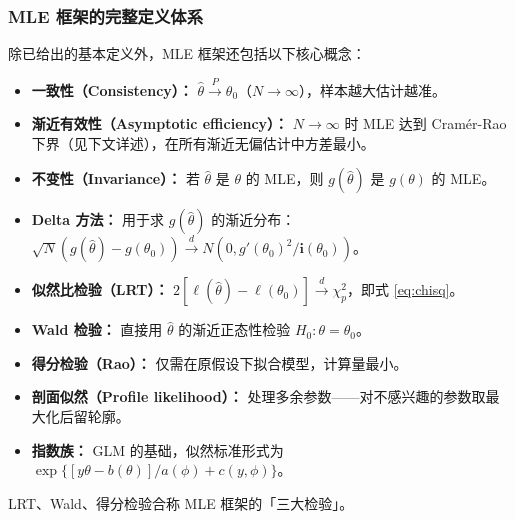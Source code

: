 \subsubsection{MLE 框架的完整定义体系}

除已给出的基本定义外，MLE 框架还包括以下核心概念：

\begin{itemize}
    \item \textbf{一致性（Consistency）：} $\hat{\theta} \xrightarrow{P} \theta_0$（$N\to\infty$），样本越大估计越准。
    \item \textbf{渐近有效性（Asymptotic efficiency）：} $N\to\infty$ 时 MLE 达到 Cramér-Rao 下界（见下文详述），在所有渐近无偏估计中方差最小。
    \item \textbf{不变性（Invariance）：} 若 $\hat{\theta}$ 是 $\theta$ 的 MLE，则 $g(\hat{\theta})$ 是 $g(\theta)$ 的 MLE。
    \item \textbf{Delta 方法：} 用于求 $g(\hat{\theta})$ 的渐近分布：$\sqrt{N}(g(\hat{\theta}) - g(\theta_0)) \xrightarrow{d} N(0, g'(\theta_0)^2/\mathbf{i}(\theta_0))$。
    \item \textbf{似然比检验（LRT）：} $2[\ell(\hat{\theta}) - \ell(\theta_0)] \xrightarrow{d} \chi^2_p$，即式 \eqref{eq:chisq}。
    \item \textbf{Wald 检验：} 直接用 $\hat{\theta}$ 的渐近正态性检验 $H_0: \theta=\theta_0$。
    \item \textbf{得分检验（Rao）：} 仅需在原假设下拟合模型，计算量最小。
    \item \textbf{剖面似然（Profile likelihood）：} 处理多余参数——对不感兴趣的参数取最大化后留轮廓。
    \item \textbf{指数族：} GLM 的基础，似然标准形式为 $\exp\{[y\theta - b(\theta)]/a(\phi) + c(y,\phi)\}$。
\end{itemize}

LRT、Wald、得分检验合称 MLE 框架的「三大检验」。

